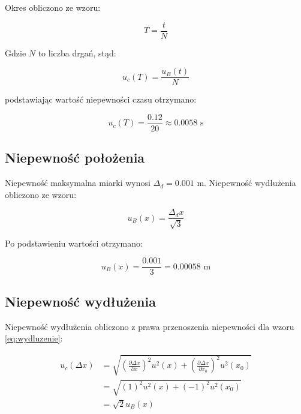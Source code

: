 \documentclass[a4paper,12pt]{article}
\begin{document}
Okres obliczono ze wzoru:

\begin{equation*}
    T = \frac{t}{N}
\end{equation*}

Gdzie $N$ to liczba drgań, stąd:

\begin{equation*}
    u_c(T) = \frac{u_B(t)}{N}
\end{equation*}

podstawiając wartość niepewności czasu otrzymano:

\begin{equation*}
    u_c(T) = \frac{0.12}{20} \approx 0.0058 \text{ s}
\end{equation*}


\subsection{Niepewność położenia}

Niepewność maksymalna miarki wynosi $\Delta_d = 0.001$ m. Niepewność wydłużenia obliczono ze wzoru:

\begin{equation*}
    u_B(x) = \frac{\Delta_d x}{\sqrt{3}}
\end{equation*}

Po podstawieniu wartości otrzymano:

\begin{equation*}
    u_B(x) = \frac{0.001}{3} = 0.00058 \text{ m}
\end{equation*}

\subsection{Niepewność wydłużenia}

Niepewność wydłużenia obliczono z prawa przenoszenia niepewności dla wzoru \ref{eq:wydluzenie}:

\begin{align*}
    u_c(\Delta x) & = \sqrt{\left(\frac{\partial \Delta x}{\partial x}\right)^2 u^2(x) + \left(\frac{\partial \Delta x}{\partial x_0}\right)^2 u^2(x_0)} \\
                  & = \sqrt{(1)^2 u^2(x) + (-1)^2 u^2(x_0)}                                                                                              \\
                  & = \sqrt{2} u_B(x)
\end{align*}
\end{document}
